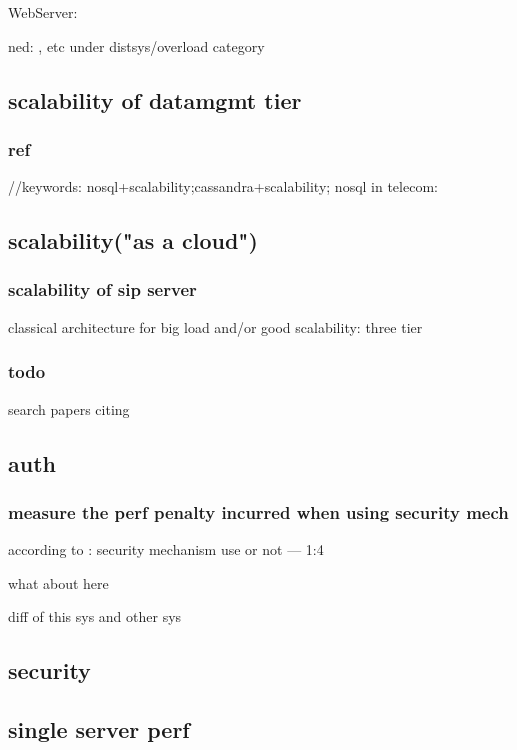 \documentclass[•]{article}
\begin{document}
WebServer: \cite{Iyer}

ned: \cite{Hong2010}, etc under distsys/overload category

\subsection{scalability of datamgmt tier}

\subsubsection{ref}
//keywords: nosql+scalability;cassandra+scalability;
nosql in telecom:\cite{Cruz2011}

\subsection{scalability("as a cloud")}
\subsubsection{scalability of sip server}
classical architecture for big load and/or good scalability: three tier \cite{Kim2011}

\subsubsection{todo}
search papers citing \cite{Vaquero2011}

\subsection{auth}

\subsubsection{measure the perf penalty incurred when using security mech}

according to \cite{Nahum2007}:
security mechanism use or not — 1:4

what about here

diff of this sys and other sys

\subsection{security}

\subsection{single server perf}
\end{document}
